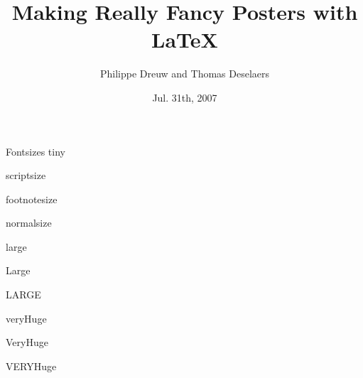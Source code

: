 \documentclass[final]{beamer} %
\title[Fancy Posters]{Making Really Fancy Posters with \LaTeX}
\author[Dreuw \& Deselaers]{Philippe Dreuw and Thomas Deselaers}
\institute[RWTH Aachen University]{Human Language Technology and Pattern Recognition,RWTH Aachen University}
\date{Jul. 31th, 2007}
\begin{document}
\begin{frame}{} 
    \vfill
    \begin{block}{\large Fontsizes}
        \centering
        {\tiny tiny}\par
        {\scriptsize scriptsize}\par
        {\footnotesize footnotesize}\par
        {\normalsize normalsize}\par
        {\large large}\par
        {\Large Large}\par
        {\LARGE LARGE}\par
        {\veryHuge veryHuge}\par
        {\VeryHuge VeryHuge}\par
        {\VERYHuge VERYHuge}\par
    \end{block}
    \vfill
\end{frame}
\end{document}
